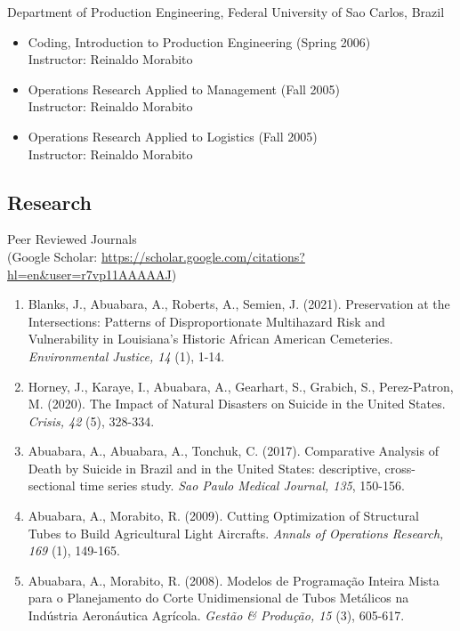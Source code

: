 \documentclass[11pt,oneside]{article}
\begin{document}
\vspace{3pt}

{Department of Production Engineering, Federal University of Sao Carlos, Brazil}
\begin{itemize}[leftmargin=20pt]
\item Coding, Introduction to Production Engineering (Spring 2006)\\
      Instructor: Reinaldo Morabito
\item Operations Research Applied to Management (Fall 2005)\\
      Instructor: Reinaldo Morabito
\item Operations Research Applied to Logistics (Fall 2005)\\
      Instructor: Reinaldo Morabito
\end{itemize}

\subsection*{Research}

{Peer Reviewed Journals}\\{\small (Google Scholar: \url{https://scholar.google.com/citations?hl=en&user=r7vp11AAAAAJ})}
\begin{enumerate}[leftmargin=20pt]
\item Blanks, J., Abuabara, A., Roberts, A., Semien, J. (2021). Preservation at the Intersections: Patterns of Disproportionate Multihazard Risk and Vulnerability in Louisiana's Historic African American Cemeteries. \emph{Environmental Justice, 14} (1), 1-14.
\item Horney, J., Karaye, I., Abuabara, A., Gearhart, S., Grabich, S., Perez-Patron, M. (2020). The Impact of Natural Disasters on Suicide in the United States. \emph{Crisis, 42} (5), 328-334.
\item Abuabara, A., Abuabara, A., Tonchuk, C. (2017). Comparative Analysis of Death by Suicide in Brazil and in the United States: descriptive, cross-sectional time series study. \emph{Sao Paulo Medical Journal, 135}, 150-156.
\item Abuabara, A., Morabito, R. (2009). Cutting Optimization of Structural Tubes to Build Agricultural Light Aircrafts. \emph{Annals of Operations Research, 169} (1), 149-165.
\item Abuabara, A., Morabito, R. (2008). Modelos de Programação Inteira Mista para o Planejamento do Corte Unidimensional de Tubos Metálicos na Indústria Aeronáutica Agrícola. \emph{Gestão \& Produção, 15} (3), 605-617.
\end{enumerate}
\end{document}
